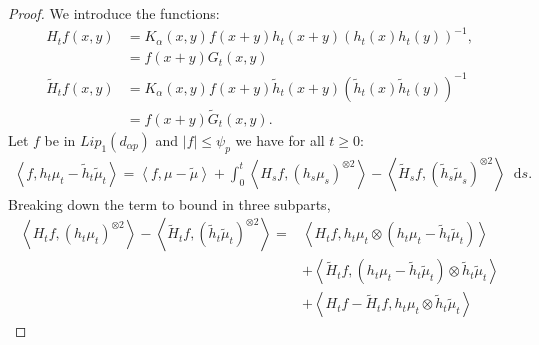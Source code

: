 \documentclass[11pt,a4paper]{article}
\newcommand{\brac}[1]{\left\langle#1\right\rangle}
\newcommand{\dd}{\mathop{}\!\mathrm{d}}
\begin{document}
\begin{proof}
    We introduce the functions:
    \begin{align*}
        H_tf(x,y) &= K_\alpha(x,y) f(x+y) h_t(x+y)\left(h_t(x)h_t(y)\right)^{-1}, \\
        &= f(x+y) G_t(x,y) \\
        \tilde{H}_tf(x,y) &= K_\alpha(x,y) f(x+y) \tilde{h}_t(x+y)\left(\tilde{h}_t(x)\tilde{h}_t(y)\right)^{-1}\\
        &= f(x+y) \tilde{G}_t(x,y).
    \end{align*}
    Let $f$ be in $Lip_1(d_{\alpha p})$ and $|f| \leq \psi_p$ we have for all $t \geq 0$:
    \begin{align*}
        \brac{f,h_t\mu_t - \tilde{h}_t \tilde{\mu}_t} = \brac{f,\mu - \tilde{\mu}} + \int_0^t \brac{H_sf,\left(h_s\mu_s\right)^{ \otimes 2}} - \brac{\tilde{H}_sf,\left(\tilde{h}_s\tilde{\mu}_s\right)^{\otimes 2}} \dd s.
    \end{align*}
    Breaking down the term to bound in three subparts,
    \begin{subequations}
        \begin{align}
            \brac{H_tf,\left(h_t\mu_t\right)^{\otimes 2}} - \brac{\tilde{H}_tf,\left(\tilde{h}_t\tilde{\mu}_t\right)^{\otimes 2}} =& \brac{H_tf,h_t\mu_t \otimes\left(h_t\mu_t -  \tilde{h}_t \tilde{\mu}_t\right)}\label{proof:eq:h_tmu_t-1} \\
            &+ \brac{\tilde{H}_tf,\left(h_t\mu_t-\tilde{h}_t\tilde{\mu}_t\right) \otimes \tilde{h}_t \tilde{\mu}_t}\label{proof:eq:h_tmu_t-2}\\
            &+ \brac{H_tf - \tilde{H}_tf,h_t\mu_t \otimes \tilde{h}_t \tilde{\mu}_t}\label{proof:eq:h_tmu_t-3}
        \end{align}
        \label{proof:eq:h_tmu_t}
    \end{subequations}


\end{proof}
\end{document}

